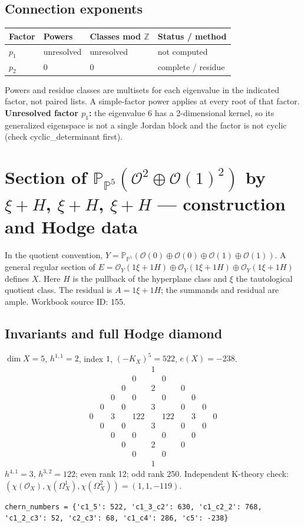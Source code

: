 \documentclass[10pt,a4paper]{article}
\begin{document}
\subsection*{Connection exponents}
\begin{center}\begin{tabular}{llll}\toprule Factor & Powers & Classes mod $\mathbb Z$ & Status / method\\\midrule
$p_{1}$ & unresolved & unresolved & not computed\\
$p_{2}$ & $0$ & $0$ & complete / residue\\
\bottomrule\end{tabular}\end{center}
Powers and residue classes are multisets for each eigenvalue in the indicated factor, not paired lists. A simple-factor power applies at every root of that factor.
\textbf{Unresolved factor $p_{1}$:} the eigenvalue 6 has a 2-dimensional kernel, so its generalized eigenspace is not a single Jordan block and the factor is not cyclic (check cyclic\_determinant first).
\clearpage\section*{Section of $\mathbb P_{\mathbb P^{5}}(\mathcal O^{2}\oplus \mathcal O(1)^{2})$ by $\xi +H$, $\xi +H$, $\xi +H$ --- construction and Hodge data}\label{entry:PB5-155}
In the quotient convention, $Y=\mathbb P_{\mathbb P^{5}}(\mathcal O(0)\oplus\mathcal O(0)\oplus\mathcal O(1)\oplus\mathcal O(1))$.
A general regular section of $E=\mathcal O_Y(1\xi+1H)\oplus\mathcal O_Y(1\xi+1H)\oplus\mathcal O_Y(1\xi+1H)$ defines $X$.
Here $H$ is the pullback of the hyperplane class and $\xi$ the tautological quotient class. The residual is $A=1\xi+1H$; the summands and residual are ample.
Workbook source ID: 155.
\subsection*{Invariants and full Hodge diamond}
$\dim X=5$, $h^{1,1}=2$, index $1$, $(-K_X)^5=522$, $e(X)=-238$.
\[\begin{array}{ccccccccccc}&&&&&1&&&&&\\&&&&0&&0&&&&\\&&&0&&2&&0&&&\\&&0&&0&&0&&0&&\\&0&&0&&3&&0&&0&\\0&&3&&122&&122&&3&&0\\&0&&0&&3&&0&&0&\\&&0&&0&&0&&0&&\\&&&0&&2&&0&&&\\&&&&0&&0&&&&\\&&&&&1&&&&&\end{array}\]
$h^{4,1}=3$, $h^{3,2}=122$; even rank 12; odd rank 250.
Independent K-theory check: $(\chi(\mathcal O_X),\chi(\Omega_X^1),\chi(\Omega_X^2))=(1, 1, -119)$.
\begin{lstlisting}
chern_numbers = {'c1_5': 522, 'c1_3_c2': 630, 'c1_c2_2': 768, 'c1_2_c3': 52, 'c2_c3': 68, 'c1_c4': 286, 'c5': -238}
\end{lstlisting}
\end{document}
